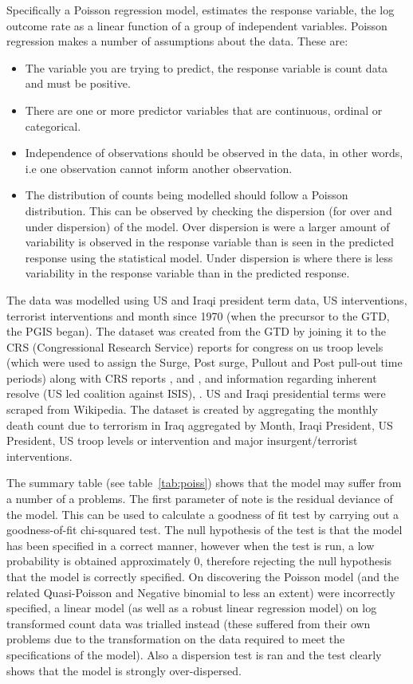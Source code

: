Specifically a Poisson regression model, estimates the response variable, the log outcome rate as a linear function of a group of independent variables. Poisson regression makes a number of assumptions about the data. These are:

\begin{itemize}
\item The variable you are trying to predict, the response variable is count data and must be positive.
\item There are one or more predictor variables that are continuous, ordinal or categorical.
\item Independence of observations should be observed in the data, in other words, i.e one observation cannot inform another observation.
\item The distribution of counts being modelled should follow a Poisson distribution. This can be observed by checking the dispersion (for over and under dispersion) of the model. Over dispersion is  were a larger amount of variability is observed in the response variable than is seen in the predicted response using the statistical model. Under dispersion is where there is less variability in the response variable than in the predicted response.
\end{itemize}

The data was modelled using US and Iraqi president term data, US interventions, terrorist interventions and month since 1970 (when the precursor to the GTD, the PGIS began). 
The dataset was created from the GTD by joining it to the CRS (Congressional Research Service) reports for congress on us troop levels (which were used to assign the Surge, Post surge, Pullout and Post pull-out time periods) along with CRS reports \citep{peters2016department}, \citep{belasco2009troop} and \citep{o2007us}, and information regarding inherent resolve (US led coalition against ISIS), \citep{fischer2015guide}. US and Iraqi presidential terms were scraped from Wikipedia. The dataset is created by aggregating the monthly death count due to terrorism in Iraq aggregated by Month, Iraqi President, US President, US troop levels or intervention and major insurgent/terrorist interventions.

The summary table (see table~\ref{tab:poiss})  shows that the model may suffer from a number of a problems. The first parameter of note is the residual deviance of the model. This can be used to calculate a goodness of fit test by carrying out a goodness-of-fit chi-squared test. The null hypothesis of the test is that the model has been specified in a correct manner, however when the test is run,  a low probability is obtained  approximately 0, therefore rejecting the null hypothesis that the model is correctly specified. On discovering the Poisson model (and the related Quasi-Poisson and Negative binomial to less an extent) were incorrectly specified, a linear model (as well as a robust linear regression model) on log transformed count data was trialled instead (these suffered from their own problems due to the transformation on the data required to meet the specifications of the model). Also a dispersion test is ran and the test clearly shows that the model is strongly over-dispersed.

